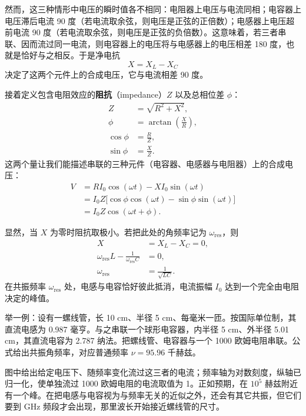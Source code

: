 然而，这三种情形中电压的瞬时值各不相同：电阻器上电压与电流同相；电容器上电压滞后电流 90 度（若电流取余弦，则电压是正弦的正倍数）；电感器上电压超前电流 90 度（若电流取余弦，则电压是正弦的负倍数）。这意味着，若三者串联、因而流过同一电流，则电容器上的电压将与电感器上的电压相差 180 度，也就是恰好与之相反。于是净电抗
\begin{equation}
X = X_{L}-X_{C}
\end{equation}
决定了这两个元件上的合成电压，它与电流相差 90 度。

接着定义包含电阻效应的\textbf{阻抗}（impedance）$Z$ 以及总相位差 $\phi$：
\begin{align}
Z &= \sqrt{R^{2}+X^{2}},\\
\phi &= \arctan\!\left(\frac{X}{R}\right),\\
\cos\phi &= \frac{R}{Z},\\
\sin\phi &= \frac{X}{Z}.
\end{align}
这两个量让我们能描述串联的三种元件（电容器、电感器与电阻器）上的合成电压：
\begin{align}
V &= RI_{0}\cos(\omega t)-XI_{0}\sin(\omega t) \nonumber\\
&= I_{0}Z\bigl[\cos\phi\cos(\omega t)-\sin\phi\sin(\omega t)\bigr] \nonumber\\
&= I_{0}Z\cos(\omega t+\phi).
\end{align}


显然，当 $X$ 为零时阻抗取极小。若把此处的角频率记为 $\omega_{\text{res}}$，则
\begin{align}
X &= X_{L}-X_{C} = 0,\\
\omega_{\text{res}}L-\frac{1}{\omega_{\text{res}}C} &= 0,\\
\omega_{\text{res}} &= \frac{1}{\sqrt{LC}}.
\end{align}
在共振频率 $\omega_{\text{res}}$ 处，电感与电容恰好彼此抵消，电流振幅 $I_{0}$ 达到一个完全由电阻决定的峰值。

举一例：设有一螺线管，长 10 cm、半径 5 cm、每毫米一匝。按国际单位制，其直流电感为 0.987 毫亨。与之串联一个球形电容器，内半径 5 cm、外半径 5.01 cm，其直流电容为 2.787 纳法。把螺线管、电容器与一个 1000 欧姆电阻串联。公式给出共振角频率，对应普通频率 $\nu=95.96$ 千赫兹。

图中给出给定电压下、随频率变化流过这三者的电流；频率轴为对数刻度，纵轴已归一化，使单独流过 1000 欧姆电阻的电流取值为 1。正如预期，在 $10^{5}$ 赫兹附近有一个峰。在把电感与电容视为与频率无关的近似之外，还会有其它共振，但它们要到 GHz 频段才会出现，那里波长开始接近螺线管的尺寸。

